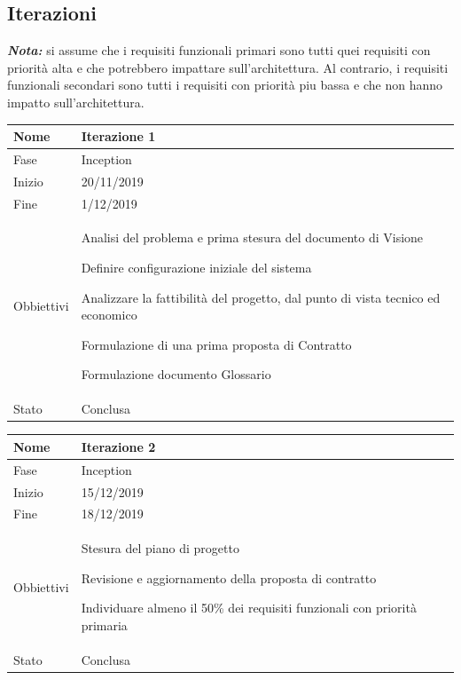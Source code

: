 \subsection{Iterazioni}

\emph{\textbf{Nota:}} si assume che i requisiti funzionali primari sono tutti quei requisiti con priorità alta e che potrebbero impattare sull'architettura. Al contrario, i requisiti funzionali secondari sono tutti i requisiti con priorità piu bassa e che non hanno impatto sull'architettura.

\begin{center}

\begin{tabular}{ |p{2cm}|p{10cm}|  }
\hline
Nome & Iterazione 1 \\\hline
Fase & Inception \\\hline
Inizio & 20/11/2019 \\\hline
Fine &  1/12/2019 \\\hline
Obbiettivi & 
	\begin{compactitem}
		\item Analisi del problema e prima stesura del documento di Visione
		\item Definire configurazione iniziale del sistema
		\item Analizzare la fattibilità del progetto, dal punto di vista tecnico ed economico
		\item Formulazione di una prima proposta di Contratto
		\item Formulazione documento Glossario
	\end{compactitem}\\\hline
Stato &  Conclusa \\\hline
\end{tabular}
\label{table:1}\newline

\begin{tabular}{ |p{2cm}|p{10cm}|  }
\hline
Nome & Iterazione 2 \\\hline
Fase & Inception \\\hline
Inizio & 15/12/2019 \\\hline
Fine &  18/12/2019 \\\hline
Obbiettivi & 
	\begin{compactitem}
		\item Stesura del piano di progetto
		\item Revisione e aggiornamento della proposta di contratto
		\item Individuare almeno il 50\% dei requisiti funzionali con priorità primaria
	\end{compactitem}\\\hline
Stato &  Conclusa \\\hline
\end{tabular}
\label{table:2}\newline


\end{center}
